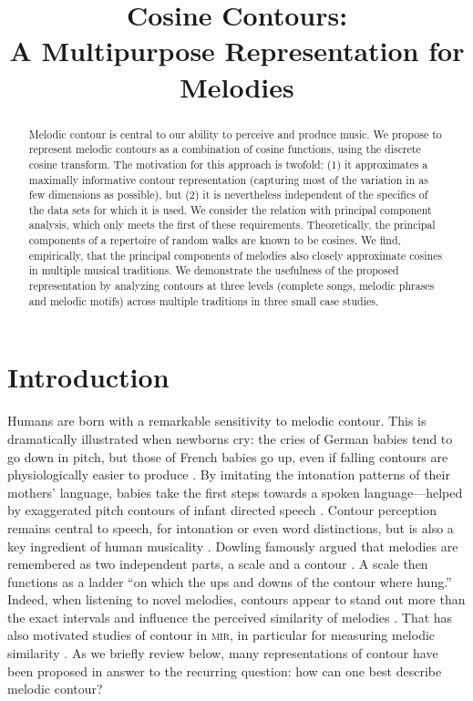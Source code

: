 \documentclass{article}
\title{Cosine Contours:\\ A  Multipurpose Representation for Melodies}
\begin{document}
\maketitle


\begin{abstract}
Melodic contour is central to our ability to perceive and produce music.
We propose to represent melodic contours as a combination of cosine functions, using the discrete cosine transform. 
The motivation for this approach is twofold: (1) it approximates a maximally informative contour representation (capturing most of the variation in as few dimensions as possible), but (2) it is nevertheless independent of the specifics of the data sets for which it is used. 
We consider the relation with principal component analysis, which only meets the first of these requirements. 
Theoretically, the principal components of a repertoire of random walks are known to be cosines. 
We find, empirically, that the principal components of melodies also closely approximate cosines in multiple musical traditions. 
We demonstrate the usefulness of the proposed representation by analyzing contours at three levels (complete songs, melodic phrases and melodic motifs) across multiple traditions in three small case studies.
\end{abstract}


\section{Introduction}


Humans are born with a remarkable sensitivity to melodic contour.
This is dramatically illustrated when newborns cry: the cries of German babies tend to go down in pitch, but those of French babies go up, even if falling contours are physiologically easier to produce \cite{Mampe2009}.
By imitating the intonation patterns of their mothers' language, babies take the first steps towards a spoken language---helped by exaggerated pitch contours of infant directed speech \cite{Wermke2021}.
Contour perception remains central to speech, for intonation or even word distinctions, but is also a key ingredient of human musicality \cite{Honing2015}.
Dowling famously argued that melodies are remembered as two independent parts, a scale and a contour \cite{Dowling1978}. 
A scale then functions as a ladder ``on which the ups and downs of the contour where hung.''
Indeed, when listening to novel melodies, contours appear to stand out more than the exact intervals and influence the perceived similarity of melodies \cite{Schmuckler2016}.
That has also motivated studies of contour in \textsc{mir}, in particular for measuring melodic similarity \cite{Mullensiefen2004b}. 
As we briefly review below, many representations of contour have been proposed in answer to the recurring question: how can one best describe melodic contour? 
\end{document}
